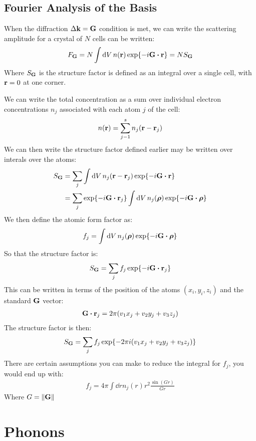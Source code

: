 \documentclass[12pt]{article}
\begin{document}
\subsection{Fourier Analysis of the Basis}
When the diffraction $\Delta{\vb{k}}=\vb{G}$ condition is met, we can write the scattering amplitude for a crystal of $N$ cells can be written:
\begin{align*}
  F_{\vb{G}}=N\int\dd{V}n(\vb{r})\exp{-i\vb{G}\vdot\vb{r}}=NS_{\vb{G}}
\end{align*}
Where $S_{\vb{G}}$ is the structure factor is defined as an integral over a single cell, with $\vb{r}=0$ at one corner.

We can write the total concentration as a sum over individual electron concentrations $n_j$ associated with each atom $j$ of the cell:
\begin{align*}
  n(\vb{r})=\sum_{j-1}^sn_j(\vb{r-r}_j)
\end{align*}
We can then write the structure factor defined earlier may be written over interals over the atoms:
\begin{align*}
  S_{\vb{G}}&=\sum_j\int\dd{V}n_j(\vb{r-r}_j)\exp{-i\vb{G\vdot r}}\\
  &=\sum_j\exp{-i\vb{G}\vdot\vb{r}_j}\int\dd{V}n_j(\vb{\bm{\rho}})
  \exp{-i\vb{G}\vdot\vb{\bm{\rho}}}
\end{align*}
We then define the atomic form factor as:
\begin{align*}
  f_j=\int\dd{V}n_j(\vb{\bm{\rho}})\exp{-i\vb{G}\vdot\vb{\bm{\rho}}}
\end{align*}
So that the structure factor is:
\begin{align*}
  S_{\vb{G}}=\sum_jf_j\exp{-i\vb{G}\vdot\vb{r}_j}
\end{align*}
This can be written in terms of the position of the atoms $(x_i,y_i,z_i)$ and the standard $\vb{G}$ vector:
\begin{align*}
  \vb{G}\vdot\vb{r}_j=2\pi\qty(v_1x_j+v_2y_j+v_3z_j)
\end{align*}
The structure factor is then:
\begin{align*}
  S_{\vb{G}}=\sum_jf_j\exp{-2\pi i(v_1x_j+v_2y_j+v_3z_j)}
\end{align*}
There are certain assumptions you can make to reduce the integral for $f_j$, you would end up with:
\begin{align*}
  f_j=4\pi\int\dd{r}n_j(r)r^2\frac{\sin(Gr)}{Gr}
\end{align*}
Where $G=\norm{\vb{G}}$
\section{Phonons}
\end{document}
